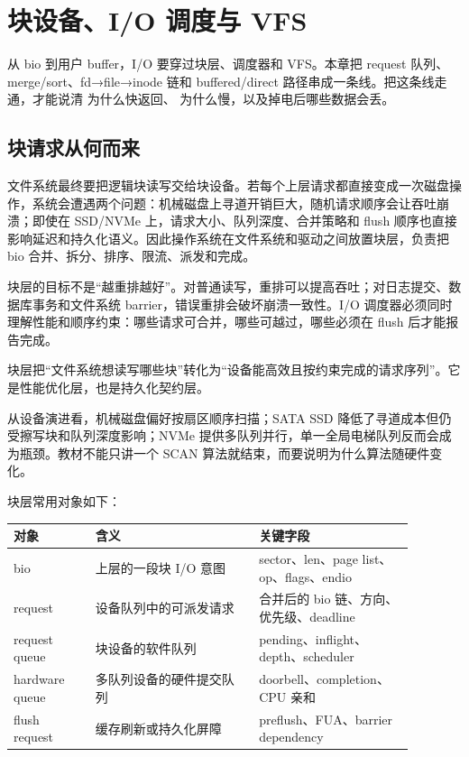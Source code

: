 \chapter{块设备、I/O 调度与 VFS}

从 bio 到用户 buffer，I/O 要穿过块层、调度器和 VFS。本章把 request 队列、merge/sort、fd→file→inode 链和 buffered/direct 路径串成一条线。把这条线走通，才能说清  为什么快返回、 为什么慢，以及掉电后哪些数据会丢。

\section{块请求从何而来}

文件系统最终要把逻辑块读写交给块设备。若每个上层请求都直接变成一次磁盘操作，系统会遭遇两个问题：机械磁盘上寻道开销巨大，随机请求顺序会让吞吐崩溃；即使在 SSD/NVMe 上，请求大小、队列深度、合并策略和 flush 顺序也直接影响延迟和持久化语义。因此操作系统在文件系统和驱动之间放置块层，负责把 bio 合并、拆分、排序、限流、派发和完成。

块层的目标不是“越重排越好”。对普通读写，重排可以提高吞吐；对日志提交、数据库事务和文件系统 barrier，错误重排会破坏崩溃一致性。I/O 调度器必须同时理解性能和顺序约束：哪些请求可合并，哪些可越过，哪些必须在 flush 后才能报告完成。

\begin{keyidea}
块层把“文件系统想读写哪些块”转化为“设备能高效且按约束完成的请求序列”。它是性能优化层，也是持久化契约层。
\end{keyidea}

从设备演进看，机械磁盘偏好按扇区顺序扫描；SATA SSD 降低了寻道成本但仍受擦写块和队列深度影响；NVMe 提供多队列并行，单一全局电梯队列反而会成为瓶颈。教材不能只讲一个 SCAN 算法就结束，而要说明为什么算法随硬件变化。

块层常用对象如下：

\begin{longtable}{|p{0.18\linewidth}|p{0.36\linewidth}|p{0.34\linewidth}|}
\toprule
对象 & 含义 & 关键字段 \\
\midrule
bio & 上层的一段块 I/O 意图 & sector、len、page list、op、flags、endio \\\tablerowrule
request & 设备队列中的可派发请求 & 合并后的 bio 链、方向、优先级、deadline \\\tablerowrule
request queue & 块设备的软件队列 & pending、inflight、depth、scheduler \\\tablerowrule
hardware queue & 多队列设备的硬件提交队列 & doorbell、completion、CPU 亲和 \\\tablerowrule
flush request & 缓存刷新或持久化屏障 & preflush、FUA、barrier dependency \\
\bottomrule
\end{longtable}

